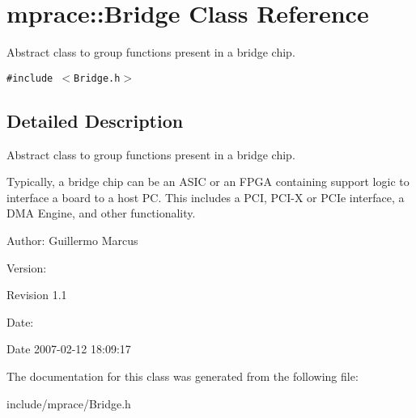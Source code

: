 \hypertarget{classmprace_1_1Bridge}{
\section{mprace::Bridge Class Reference}
\label{classmprace_1_1Bridge}
}
Abstract class to group functions present in a bridge chip.  


{\tt \#include $<$Bridge.h$>$}



\subsection{Detailed Description}
Abstract class to group functions present in a bridge chip. 

Typically, a bridge chip can be an ASIC or an FPGA containing support logic to interface a board to a host PC. This includes a PCI, PCI-X or PCIe interface, a DMA Engine, and other functionality.

\begin{Desc}
\item[Author:]Guillermo Marcus \end{Desc}
\begin{Desc}
\item[Version:]\begin{Desc}
\item[Revision]1.1 \end{Desc}
\end{Desc}
\begin{Desc}
\item[Date:]\begin{Desc}
\item[Date]2007-02-12 18:09:17 \end{Desc}
\end{Desc}




The documentation for this class was generated from the following file:\begin{CompactItemize}
\item 
include/mprace/Bridge.h\end{CompactItemize}
